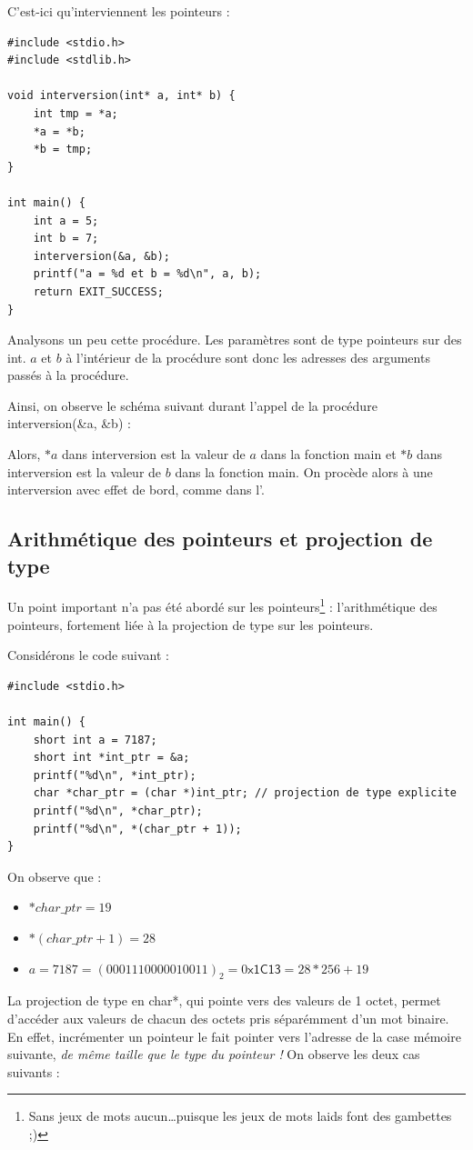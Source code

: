 \documentclass[../../../main.tex]{subfiles}
\begin{document}
C'est-ici qu'interviennent les pointeurs :
\begin{verbatim}
#include <stdio.h>
#include <stdlib.h>

void interversion(int* a, int* b) {
	int tmp = *a;
	*a = *b;
	*b = tmp;
}

int main() {
	int a = 5;
	int b = 7;
	interversion(&a, &b);
	printf("a = %d et b = %d\n", a, b);
	return EXIT_SUCCESS;
}
\end{verbatim}
Analysons un peu cette procédure. Les paramètres sont de type pointeurs sur des \textsf{int}. $a$ et $b$ à l'intérieur de la procédure sont donc les adresses des arguments passés à la procédure.
 
Ainsi, on observe le schéma suivant durant l'appel de la procédure \textsf{interversion(\&a, \&b)} :  

\begin{minipage}{\textwidth}
	\begin{center}
		
	\end{center}
\end{minipage}
 
Alors, $*a$ dans \textsf{interversion} est la valeur de $a$ dans la fonction \textsf{main} et $*b$ dans \textsf{interversion} est la valeur de $b$ dans la fonction \textsf{main}. On procède alors à une interversion avec effet de bord, comme dans l'.
 
\subsection{Arithmétique des pointeurs et projection de type}
\label{sub:arithm_tique_des_pointeurs_et_projection_de_type}
Un point important n'a pas été abordé sur les pointeurs\footnote{Sans jeux de mots aucun\dots puisque les jeux de mots laids font des gambettes ;)} : l'arithmétique des pointeurs, fortement liée à la projection de type sur les pointeurs.
 
Considérons le code suivant :
\begin{verbatim}
#include <stdio.h>

int main() {
	short int a = 7187;
	short int *int_ptr = &a;
	printf("%d\n", *int_ptr);
	char *char_ptr = (char *)int_ptr; // projection de type explicite
	printf("%d\n", *char_ptr);
	printf("%d\n", *(char_ptr + 1));
}
\end{verbatim}
On observe que :
\begin{itemize}
	\item $*char\_ptr = 19$
	\item $*(char\_ptr + 1) = 28$
	\item $a = 7187 = (0001110000010011)_{2} = 0\textsf{x1C13} = 28 * 256 + 19$
\end{itemize}
La projection de type en \textsf{char*}, qui pointe vers des valeurs de 1 octet, permet d'accéder aux valeurs de chacun des octets pris séparémment d'un mot binaire. En effet, incrémenter un pointeur le fait pointer vers l'adresse de la case mémoire suivante, \textit{de même taille que le type du pointeur !} On observe les deux cas suivants : 
\end{document}
